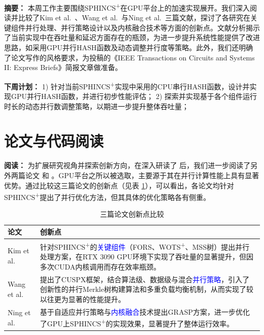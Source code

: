 \documentclass[report]{../../custom}
\begin{document}
\maketitle

\noindent \textbf{摘要：} 本周工作主要围绕SPHINCS\textsuperscript{+}在GPU平台上的加速实现展开。我们深入阅读并比较了Kim et al.~\cite{Kim2024}、Wang et al.~\cite{Wang2025}与Ning et al.~\cite{Ning2024}三篇文献，探讨了各研究在关键组件并行处理、并行策略设计以及内核融合技术等方面的创新点。文献分析揭示了当前实现中在吞吐量和延迟方面存在的瓶颈，为进一步提升系统性能提供了改进思路，如采用GPU并行HASH函数及动态调整并行度等策略。此外，我们还明确了论文写作的风格要求，为投稿的《IEEE Transactions on Circuits and Systems II: Express Briefs》简报文章做准备。

\vskip 0.5cm

\noindent \textbf{下周计划：}
1) 针对当前SPHINCS\textsuperscript{+}实现中采用的CPU串行HASH函数，设计并实现GPU并行HASH函数，并进行初步性能评估；
2) 探索并实现基于各个组件运行时长的动态并行数调整策略，以期进一步提升整体吞吐量；

\section{论文与代码阅读}

\noindent \textbf{阅读：} 为扩展研究视角并探索创新方向，在深入研读了 \cite{Wang2025} 后，我们进一步阅读了另外两篇论文 \cite{Kim2024} 和 \cite{Ning2024}。GPU平台之所以被选取，主要源于其在并行计算性能上具有显著优势。通过比较这三篇论文的创新点（见表 \ref{tab:innovation}），可以看出，各论文均针对SPHINCS\textsuperscript{+}提出了并行优化方法，但其具体的优化策略各有侧重。

\begin{table}[ht]
\centering
\caption{三篇论文创新点比较}
\label{tab:innovation}
\begin{tabular}{l p{}}
\toprule
论文 & 创新点 \\
\midrule
Kim et al.~\cite{Kim2024} & 针对SPHINCS\textsuperscript{+}的\textcolor{blue}{关键组件}（FORS、WOTS\textsuperscript{+}、MSS树）提出并行处理方案，在RTX 3090 GPU环境下实现了吞吐量的显著提升，但因多次CUDA内核调用而存在效率瓶颈。 \\
\addlinespace
Wang et al.~\cite{Wang2025} & 提出了CUSPX框架，结合算法级、数据级与混合\textcolor{blue}{并行策略}，引入了创新性的并行Merkle树构建算法和多重负载均衡机制，从而实现了较以往更为显著的性能提升。 \\
\addlinespace
Ning et al.~\cite{Ning2024} & 基于自适应并行策略与\textcolor{blue}{内核融合}技术提出GRASP方案，进一步优化了GPU上SPHINCS\textsuperscript{+}的实现效果，显著提升了整体运行效率。 \\
\bottomrule
\end{tabular}
\end{table}
\end{document}
